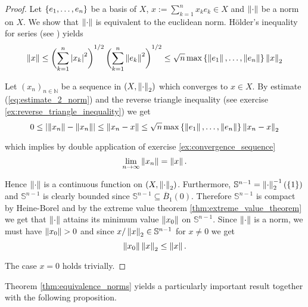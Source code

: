 \begin{proof}
	Let $\cbr[0]{e_1,\dots,e_n}$ be a basis of $X$, $x := \sum_{k = 1}^n x_ke_k \in X$ and $\norm[0]{\cdot}$ be a norm on $X$. We show that $\norm[0]{\cdot}$ is equivalent to the euclidean norm. H\"older's inequality for series (see \cite[224]{elstrodt:mass:2011}) yields
	\begin{equation}
		\norm[0]{x} \leq \del[3]{\sum_{k = 1}^n \abs[0]{x_k}^2}^{1/2} \del[3]{\sum_{k = 1}^n \norm[0]{e_k}^2}^{1/2}\leq \sqrt{n}\max\cbr[0]{\norm[0]{e_1},\dots,\norm[0]{e_n}}\norm[0]{x}_2
		\label{eq:estimate_2_norm}
	\end{equation}

	Let $(x_n)_{n \in \mathbb{N}}$ be a sequence in $(X,\norm[0]{\cdot}_2)$ which converges to $x \in X$. By estimate (\ref{eq:estimate_2_norm}) and the reverse triangle inequality (see exercise \ref{ex:reverse_triangle_inequality}) we get
	\begin{equation}
		0 \leq \abs[0]{\norm[0]{x_n} - \norm[0]{x_n}} \leq \norm[0]{x_n - x} \leq \sqrt{n}\max\cbr[0]{\norm[0]{e_1},\dots,\norm[0]{e_n}}\norm[0]{x_n - x}_2
	\end{equation}

	\noindent which implies by double application of exercise \ref{ex:convergence_sequence}
	\begin{equation}
		\lim_{n \to \infty} \norm[0]{x_n} = \norm[0]{x}.
	\end{equation}

	Hence $\norm[0]{\cdot}$ is a continuous function on $(X,\norm[0]{\cdot}_2)$. Furthermore, $\mathbb{S}^{n - 1} = \norm[0]{\cdot}^{-1}_2(\cbr[0]{1})$ and $\mathbb{S}^{n-1}$ is clearly bounded since $\mathbb{S}^{n-1} \subseteq \overline{B}_1(0)$. Therefore $\mathbb{S}^{n - 1}$ is compact by Heine-Borel and by the extreme value theorem \ref{thm:extreme_value_theorem} we get that $\norm[0]{\cdot}$ attains its minimum value $\norm[0]{x_0}$ on $\mathbb{S}^{n-1}$. Since $\norm[0]{\cdot}$ is a norm, we must have $\norm[0]{x_0} > 0$ and since $x/\norm[0]{x}_2 \in \mathbb{S}^{n - 1}$ for $x \neq 0$ we get 
	\begin{equation}
		\norm[0]{x_0} \norm[0]{x}_2 \leq \norm[0]{x}.
	\end{equation}

	The case $x = 0$ holds trivially.
\end{proof}

Theorem \ref{thm:equivalence_norms} yields a particularly important result together with the following proposition.

